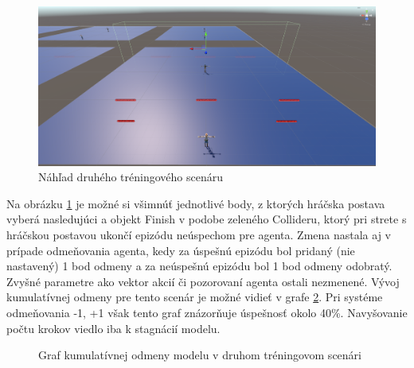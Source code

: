 \documentclass[slovak, master]{diploma}
\begin{document}
\begin{figure}[!htbp]
    \centering
    \includegraphics[width=.8\textwidth]{Figures/scenar2.png}
    \caption{Náhľad druhého tréningového scenáru}
    \label{pic:secondScenario}
\end{figure}

Na obrázku \ref{pic:secondScenario} je možné si všimnúť jednotlivé body, z ktorých hráčska postava vyberá nasledujúci a objekt Finish v podobe zeleného Collideru, ktorý pri strete s hráčskou postavou ukončí epizódu neúspechom pre agenta. Zmena nastala aj v prípade odmeňovania agenta, kedy za úspešnú epizódu bol pridaný (nie nastavený) 1 bod odmeny a za neúspešnú epizódu bol 1 bod odmeny odobratý. Zvyšné parametre ako vektor akcií či pozorovaní agenta ostali nezmenené. Vývoj kumulatívnej odmeny pre tento scenár je možné vidieť v grafe \ref{plt:secondScenario}. Pri systéme odmeňovania -1, +1 však tento graf znázorňuje úspešnosť okolo 40\%. Navyšovanie počtu krokov viedlo iba k stagnácií modelu.

\begin{figure}[!htbp]
    \centering
    \caption{Graf kumulatívnej odmeny modelu v druhom tréningovom scenári}
    \label{plt:secondScenario}
\end{figure}
\end{document}
